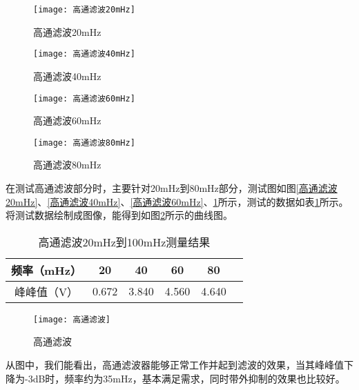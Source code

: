 \documentclass{zjureport}
\begin{document}
	\begin{figure}[H]
		\centering
		\begin{minipage}[t]{0.4\linewidth}%
			\texttt{[image: 高通滤波20mHz]}%
			\caption{高通滤波20mHz}
			\label{高通滤波20mHz}
		\end{minipage}%
		\begin{minipage}[t]{0.4\linewidth}
			\texttt{[image: 高通滤波40mHz]}
			\caption{高通滤波40mHz}
			\label{高通滤波40mHz}
		\end{minipage}
		
		\begin{minipage}[t]{0.4\linewidth}%
			\texttt{[image: 高通滤波60mHz]}%
			\caption{高通滤波60mHz}
			\label{高通滤波60mHz}
		\end{minipage}%
		\begin{minipage}[t]{0.4\linewidth}%
			\texttt{[image: 高通滤波80mHz]}%
			\caption{高通滤波80mHz}
			\label{高通滤波80mHz}
		\end{minipage}%
	\end{figure}

	在测试高通滤波部分时，主要针对20mHz到80mHz部分，测试图如图\ref{高通滤波20mHz}、\ref{高通滤波40mHz}、\ref{高通滤波60mHz}、\ref{高通滤波80mHz}所示，测试的数据如表\ref{高通滤波20mHz到100mHz测量结果}所示。将测试数据绘制成图像，能得到如图\ref{高通滤波}所示的曲线图。
	
	\begin{table}[htbp]
		\centering
		\begin{tabular}{ c|c|c|c|c p{1.5cm}}
			\hline
			频率（mHz） & 20 & 40 & 60 & 80  \\
			\hline
			峰峰值（V）  & 0.672 & 3.840 & 4.560 & 4.640 \\
			\hline
		\end{tabular}
		\caption{高通滤波20mHz到100mHz测量结果}\label{高通滤波20mHz到100mHz测量结果}
	\end{table}
	
	\begin{figure}[h]
		\centering%
		\texttt{[image: 高通滤波]}
		\caption{高通滤波}%
		\label{高通滤波}%
	\end{figure}

	从图中，我们能看出，高通滤波器能够正常工作并起到滤波的效果，当其峰峰值下降为-3dB时，频率约为35mHz，基本满足需求，同时带外抑制的效果也比较好。
	
\end{document}
